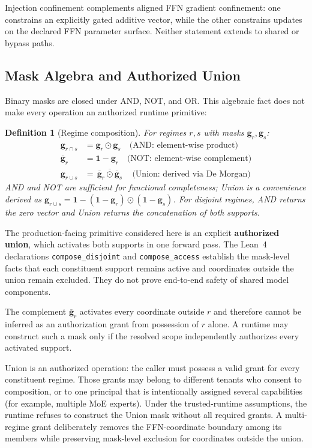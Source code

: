 \documentclass[11pt,a4paper]{article}
\newtheorem{definition}{Definition}
\newcommand{\bg}{\mathbf{g}}
\begin{document}
Injection confinement complements aligned FFN gradient confinement:
one constrains an explicitly gated additive vector, while the other
constrains updates on the declared FFN parameter surface.  Neither
statement extends to shared or bypass paths.

\subsection{Mask Algebra and Authorized Union}
\label{sec:composition}

Binary masks are closed under AND, NOT, and OR.  This algebraic fact
does not make every operation an authorized runtime primitive:

\begin{definition}[Regime composition]
\label{def:composition}
For regimes $r, s$ with masks $\bg_r, \bg_s$:
\begin{align}
    \bg_{r \cap s} &= \bg_r \odot \bg_s
    \quad\text{(AND: element-wise product)}
    \label{eq:and} \\
    \overline{\bg}_r &= \mathbf{1} - \bg_r
    \quad\text{(NOT: element-wise complement)}
    \label{eq:not} \\
    \bg_{r \cup s} &= \overline{\,\overline{\bg}_r \odot \overline{\bg}_s\,}
    \quad\text{(Union: derived via De~Morgan)}
    \label{eq:union}
\end{align}
AND and NOT are sufficient for functional completeness; Union is a
convenience derived as $\bg_{r\cup s}=\mathbf{1}-(\mathbf{1}-\bg_r)\odot(\mathbf{1}-\bg_s)$.
For disjoint regimes, AND returns the zero vector and Union
returns the concatenation of both supports.
\end{definition}

The production-facing primitive considered here is an explicit
\textbf{authorized union}, which activates both supports in one forward
pass.  The Lean~4 declarations \texttt{compose\_disjoint} and
\texttt{compose\_access} establish the mask-level facts that each
constituent support remains active and coordinates outside the union
remain excluded.  They do not prove end-to-end safety of shared model
components.

The complement $\overline{\bg}_r$ activates every coordinate outside
$r$ and therefore cannot be inferred as an authorization grant from
possession of $r$ alone.  A runtime may construct such a mask only if
the resolved scope independently authorizes every activated support.

Union is an authorized operation: the caller must possess a valid
grant for every constituent regime.  Those grants may belong to
different tenants who consent to composition, or to one principal
that is intentionally assigned several capabilities (for example,
multiple MoE experts).  Under the trusted-runtime assumptions, the
runtime refuses to construct the Union mask without all required
grants.  A multi-regime grant deliberately removes the FFN-coordinate
boundary among its members while preserving mask-level exclusion for
coordinates outside the union.
\end{document}
